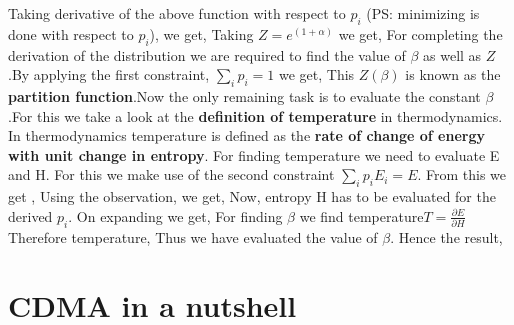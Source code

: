 \documentclass[letterpaper,english,10pt]{article}
\begin{document}
Taking derivative of the above function with respect to $p_i$ (PS: minimizing is done with
respect to $p_i$), we get,
Taking $Z = e^{(1+\alpha)}$ we get,
For completing the derivation of the distribution we are required to find the value of $\beta$ as well as $Z$.By applying the first constraint, $\sum_i p_i = 1$ we get, 
This $Z(\beta)$ is known as the \textbf{partition function}.Now the only remaining task is to evaluate the constant $\beta$.For this we take a look at the \textbf{definition of temperature} in thermodynamics. In thermodynamics temperature is defined as the \textbf{rate of change of energy with unit change in entropy}. 
For finding temperature we need to evaluate E and H. For this we make use of the second constraint $\sum_i p_i E_i= E$. From this we get ,
Using the observation, 
we get,
Now, entropy H has to be evaluated for the derived $p_i$. 
On expanding we get,
For finding $\beta$ we find temperature$ T = \frac{\partial E}{\partial H} $
Therefore temperature,
Thus we have evaluated the value of $\beta$. Hence the result, 


\section{CDMA in a nutshell}
\end{document}
